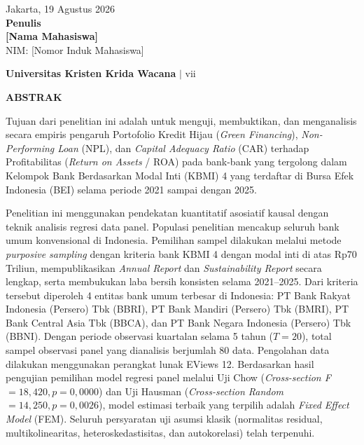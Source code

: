 \documentclass[12pt,a4paper]{article}
\newcommand{\ukrida}{Universitas Kristen Krida Wacana}
\newcommand{\nahamahasiswa}{[Nama Mahasiswa]}
\newcommand{\nim}{[Nomor Induk Mahasiswa]}
\numberwithin{equation}{section}
\begin{document}
\vspace{0.8cm}
\begin{flushright}
  Jakarta, 19 Agustus 2026\\[0.3cm]
  \textbf{Penulis}\\[1.8cm]
  \textbf{\nahamahasiswa}\\
  NIM: \nim
\end{flushright}

\vfill
\begin{flushright}
  \footnotesize\textbf{\ukrida} $|$ vii
\end{flushright}

\newpage
\thispagestyle{frontmatter}
\begin{center}
  {\large\bfseries ABSTRAK}
\end{center}

\vspace{0.4cm}
\noindent
Tujuan dari penelitian ini adalah untuk menguji, membuktikan, dan menganalisis secara empiris pengaruh Portofolio Kredit Hijau (\emph{Green Financing}), \emph{Non-Performing Loan} (NPL), dan \emph{Capital Adequacy Ratio} (CAR) terhadap Profitabilitas (\emph{Return on Assets} / ROA) pada bank-bank yang tergolong dalam Kelompok Bank Berdasarkan Modal Inti (KBMI) 4 yang terdaftar di Bursa Efek Indonesia (BEI) selama periode 2021 sampai dengan 2025.

\noindent
Penelitian ini menggunakan pendekatan kuantitatif asosiatif kausal dengan teknik analisis regresi data panel. Populasi penelitian mencakup seluruh bank umum konvensional di Indonesia. Pemilihan sampel dilakukan melalui metode \emph{purposive sampling} dengan kriteria bank KBMI 4 dengan modal inti di atas Rp70 Triliun, mempublikasikan \emph{Annual Report} dan \emph{Sustainability Report} secara lengkap, serta membukukan laba bersih konsisten selama 2021--2025. Dari kriteria tersebut diperoleh 4 entitas bank umum terbesar di Indonesia: PT Bank Rakyat Indonesia (Persero) Tbk (BBRI), PT Bank Mandiri (Persero) Tbk (BMRI), PT Bank Central Asia Tbk (BBCA), dan PT Bank Negara Indonesia (Persero) Tbk (BBNI). Dengan periode observasi kuartalan selama 5 tahun ($T=20$), total sampel observasi panel yang dianalisis berjumlah 80 data. Pengolahan data dilakukan menggunakan perangkat lunak EViews 12. Berdasarkan hasil pengujian pemilihan model regresi panel melalui Uji Chow (\emph{Cross-section F} $= 18{,}420, p = 0{,}0000$) dan Uji Hausman (\emph{Cross-section Random} $= 14{,}250, p = 0{,}0026$), model estimasi terbaik yang terpilih adalah \emph{Fixed Effect Model} (FEM). Seluruh persyaratan uji asumsi klasik (normalitas residual, multikolinearitas, heteroskedastisitas, dan autokorelasi) telah terpenuhi.
\end{document}
